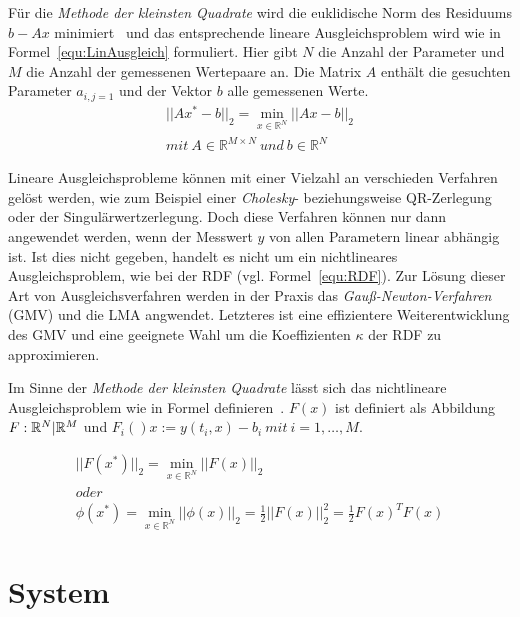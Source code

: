 Für die \textit{Methode der kleinsten Quadrate} wird die euklidische Norm des Residuums $b-Ax$ minimiert~\cite{dahmen2008numerik} und das entsprechende lineare Ausgleichsproblem wird wie in Formel~\ref{equ:LinAusgleich} formuliert. Hier gibt $N$ die Anzahl der Parameter und $M$ die Anzahl der gemessenen Wertepaare an. Die Matrix $A$ enthält die gesuchten Parameter $a_{i,j=1}$ und der Vektor $b$ alle gemessenen Werte.
\begin{equation}
\label{equ:LinAusgleich}
\begin{split}
||Ax^*-b||_2 = \min_{x\in \mathbb{R}^N} ||Ax-b||_2\\
mit\ A\in \mathbb{R}^{M\times N}\ und\ b\in \mathbb{R}^{N}
\end{split}
\end{equation}

Lineare Ausgleichsprobleme können mit einer Vielzahl an verschieden Verfahren gelöst werden, wie zum Beispiel einer \textit{Cholesky}- beziehungsweise QR-Zerlegung oder der Singulärwertzerlegung.
Doch diese Verfahren können nur dann angewendet werden, wenn der Messwert $y$ von allen Parametern linear abhängig ist. Ist dies nicht gegeben, handelt es nicht um ein nichtlineares Ausgleichsproblem, wie bei der RDF (vgl. Formel~\ref{equ:RDF}). Zur Lösung dieser Art von Ausgleichsverfahren werden in der Praxis das \textit{Gauß-Newton-Verfahren} (GMV) und die LMA angwendet. Letzteres ist eine effizientere Weiterentwicklung des GMV und eine geeignete Wahl um die Koeffizienten $\kappa$ der RDF zu approximieren.

Im Sinne der \textit{Methode der kleinsten Quadrate} lässt sich das nichtlineare Ausgleichsproblem wie in Formel definieren~\cite{schwarz2011numerische}. $F(x)$ ist definiert als Abbildung $F: \mathbb{R}^N \arrowvert \mathbb{R}^M$ und $F_i()x:= y(t_i,x)-b_i\ mit\ i= 1,\dots,M$. 

\begin{equation}
\label{equ:LinAusgleich}
\begin{split}
||F(x^*)||_2 = \min_{x\in \mathbb{R}^N} ||F(x)||_2\\
oder\\
\phi(x^*)=\min_{x\in \mathbb{R}^N} ||\phi(x)||_2 = \frac{1}{2}||F(x)||_2^2 = \frac{1}{2}F(x)^TF(x)
\end{split}
\end{equation}
 

\section{System}

